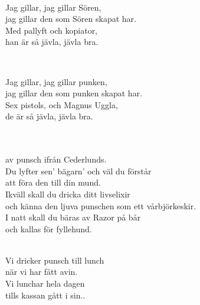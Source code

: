 
 \\       

\songtext{}
Jag gillar, jag gillar Sören, \\
jag gillar den som Sören skapat har.  \\
Med pallyft och kopiator, \\
han är så jävla, jävla bra. \\

\newpage


 \\       

\songtext{}
Jag gillar, jag gillar punken, \\
jag gillar den som punken skapat har. \\
Sex pistols, och Magnus Uggla, \\
de är så jävla, jävla bra. \\




 \\       

\\
av punsch ifrån Cederlunds.\\ 
Du lyfter sen' bägarn' och väl du förstår\\ 
att föra den till din mund.\\ 
Ikväll skall du dricka ditt livselixir\\ 
och känna den ljuva punschen som ett vårbjörkeskir.\\ 
I natt skall du bäras av Razor på bår\\ 
och kallas för fyllehund.\\


 \\       

\leftrepeat \songtext{}Vi dricker punsch till lunch \\
när vi har fått avin. \\
Vi lunchar hela dagen \\
tills kassan gått i sin.. \rightrepeat

